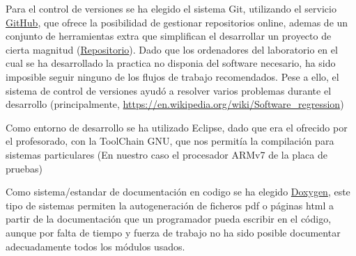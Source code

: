 \documentclass[12pt,letterpaper]{article}
\begin{document}
Para el control de versiones se ha elegido el sistema Git, utilizando
el servicio \href{https://www.github.com}{GitHub}, que ofrece la
posibilidad de gestionar repositorios online, ademas de un conjunto de
herramientas extra que simplifican el desarrollar un proyecto de
cierta magnitud
(\href{https://www.github.com/wynro/proyecto\_hardware}{Repositorio}). Dado
que los ordenadores del laboratorio en el cual se ha desarrollado la
practica no disponia del software necesario, ha sido imposible seguir
ninguno de los flujos de trabajo recomendados. Pese a ello, el sistema
de control de versiones ayudó a resolver varios problemas durante el
desarrollo (principalmente, \href{regresiones de
  software}{https://en.wikipedia.org/wiki/Software\_regression})

Como entorno de desarrollo se ha utilizado Eclipse, dado que era el
ofrecido por el profesorado, con la ToolChain GNU, que nos permitía la
compilación para sistemas particulares (En nuestro caso el procesador
ARMv7 de la placa de pruebas)

Como sistema/estandar de documentación en codigo se ha elegido
\href{http://www.stack.nl/~dimitri/doxygen/}{Doxygen}, este tipo de
sistemas permiten la autogeneración de ficheros pdf o páginas html a
partir de la documentación que un programador pueda escribir en el
código, aunque por falta de tiempo y fuerza de trabajo no ha sido
posible documentar adecuadamente todos los módulos usados.
\end{document}
